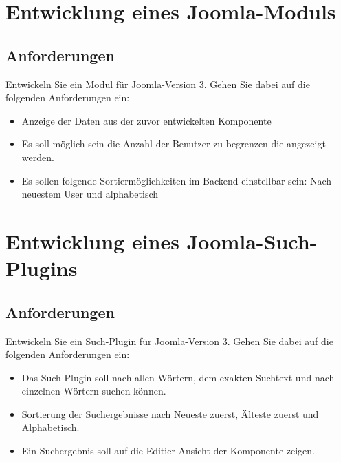 \documentclass[]{article}
\begin{document}
\section{Entwicklung eines Joomla-Moduls}
\subsection{Anforderungen}
Entwickeln Sie ein Modul für Joomla-Version 3. Gehen Sie dabei auf die folgenden Anforderungen ein:
\begin{itemize}
\item Anzeige der Daten aus der zuvor entwickelten Komponente
\item Es soll möglich sein die Anzahl der Benutzer zu begrenzen die angezeigt werden.
\item Es sollen folgende Sortiermöglichkeiten im Backend einstellbar sein: Nach neuestem User und alphabetisch
\end{itemize}

\section{Entwicklung eines Joomla-Such-Plugins}
\subsection{Anforderungen}
Entwickeln Sie ein Such-Plugin für Joomla-Version 3. Gehen Sie dabei auf die folgenden Anforderungen ein:
\begin{itemize}
\item Das Such-Plugin soll nach allen Wörtern, dem exakten Suchtext und nach einzelnen Wörtern suchen können.
\item Sortierung der Suchergebnisse nach Neueste zuerst, Älteste zuerst und Alphabetisch.
\item Ein Suchergebnis soll auf die Editier-Ansicht der Komponente zeigen.
\end{itemize}
\end{document}
